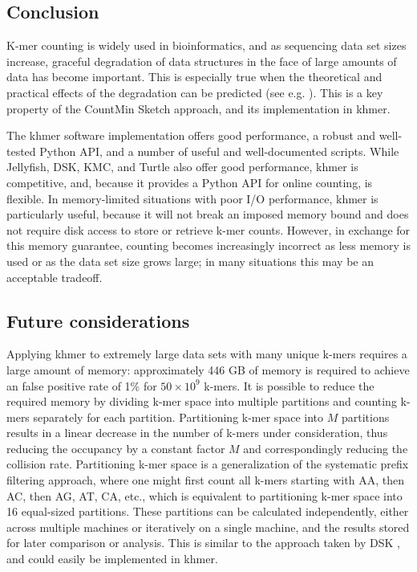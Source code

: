 \documentclass[10pt]{article}
\begin{document}
\subsection*{Conclusion}

K-mer counting is widely used in bioinformatics, and as sequencing
data set sizes increase, graceful degradation of data structures in
the face of large amounts of data has become important.  This is
especially true when the theoretical and practical effects of the
degradation can be predicted (see e.g. \cite{Melsted2011, Pell2012,
  Roy2014}).  This is a key property of the CountMin Sketch approach,
and its implementation in khmer.

The khmer software implementation offers good performance, a robust
and well-tested Python API, and a number of useful and well-documented
scripts.  While Jellyfish, DSK, KMC, and Turtle also offer good
performance, khmer is competitive, and, because it provides a Python
API for online counting, is flexible.  In memory-limited situations
with poor I/O performance, khmer is particularly useful, because it
will not break an imposed memory bound and does not require disk
access to store or retrieve k-mer counts.  However, in exchange for
this memory guarantee, counting becomes increasingly incorrect as less
memory is used or as the data set size grows large; in many situations
this may be an acceptable tradeoff.

\subsection*{Future considerations}

Applying khmer to extremely large data sets with many unique k-mers
requires a large amount of memory: approximately 446 GB of memory is
required to achieve an false positive rate of 1\% for $50\times 10^9$
k-mers. It is possible to reduce the required memory by dividing k-mer
space into multiple partitions and counting k-mers separately for each
partition. Partitioning k-mer space into $M$ partitions results in a
linear decrease in the number of k-mers under consideration, thus
reducing the occupancy by a constant factor $M$ and correspondingly
reducing the collision rate.  Partitioning k-mer space is a
generalization of the systematic prefix filtering approach, where one
might first count all k-mers starting with AA, then AC, then AG, AT,
CA, etc., which is equivalent to partitioning k-mer space into 16
equal-sized partitions. These partitions can be calculated
independently, either across multiple machines or iteratively on a
single machine, and the results stored for later comparison or
analysis.  This is similar to the approach taken by DSK
\cite{Rizk2013}, and could easily be implemented in khmer.
\end{document}

